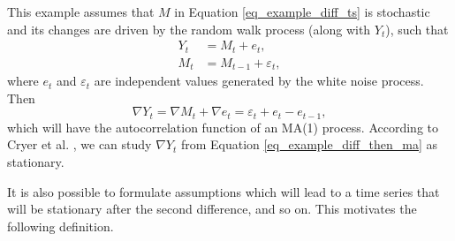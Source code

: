 This example assumes that $M$ in Equation \ref{eq_example_diff_ts} is stochastic and its changes are driven by the random walk process (along with $Y_t$), such that \begin{equation}
\begin{aligned}
    Y_t &= M_t + e_t, \\
    M_t &= M_{t-1} + \varepsilon_t,
\end{aligned}
\end{equation}
where $e_t$ and $\varepsilon_t$ are independent values generated by the white noise process. Then \begin{equation}
    \nabla Y_t = \nabla M_t + \nabla e_t = \varepsilon_t + e_t - e_{t-1},
\label{eq_example_diff_then_ma}
\end{equation}
which will have the autocorrelation function of an MA(1) process. According to Cryer et al. \cite{cryer2008time}, we can study $\nabla Y_t$ from Equation \ref{eq_example_diff_then_ma} as stationary.

It is also possible to formulate assumptions which will lead to a time series that will be stationary after the second difference, and so on. This motivates the following definition.

